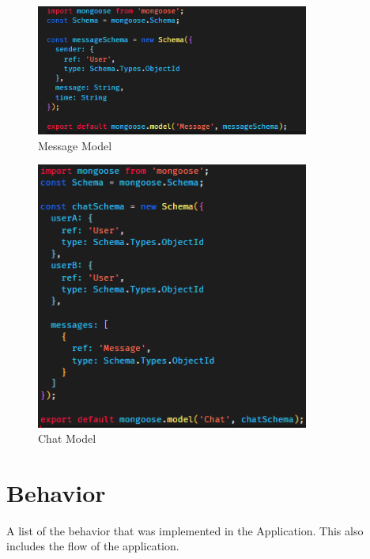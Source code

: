         \begin{figure}[h]
            \centering
            \includegraphics[width=0.8\textwidth]{images/messageModel.png}
            \caption{Message Model}
            \label{fig:messageModel}
        \end{figure}


        \begin{figure}[h]
            \centering
            \includegraphics[width=0.8\textwidth]{images/chatModel.png}
            \caption{Chat Model}
            \label{fig:chatModel}
        \end{figure}


    \pagebreak
    \clearpage

    \section{Behavior}
    A list of the behavior that was implemented in the Application. This also includes the flow of the application.

